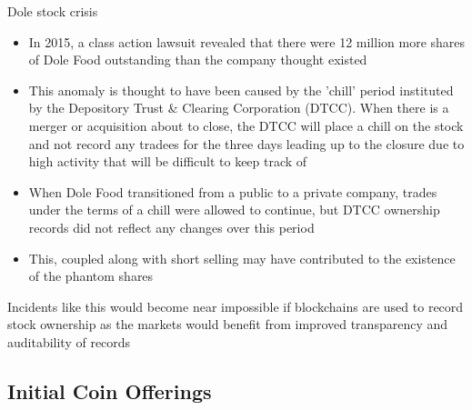 \documentclass[11pt]{beamer}
\begin{document}


\begin{frame}{Dole stock crisis}
	\begin{itemize}
		\item In 2015, a class action lawsuit revealed that there were 12 million more shares of Dole Food outstanding than the company thought existed
		\item This anomaly is thought to have been caused by the 'chill' period instituted by the Depository Trust \& Clearing Corporation (DTCC). When there is a merger or acquisition about to close, the DTCC will place a chill on the stock and not record any tradees for the three days leading up to the closure due to high activity that will be difficult to keep track of
		\item When Dole Food transitioned from a public to a private company, trades under the terms of a chill were allowed to continue, but DTCC ownership records did not reflect any changes over this period
		\item This, coupled along with short selling may have contributed to the existence of the phantom shares
	\end{itemize}
	Incidents like this would become near impossible if blockchains are used to record stock ownership as the markets would benefit from improved transparency and auditability of records
\end{frame}



\subsection{Initial Coin Offerings}

\end{document}
